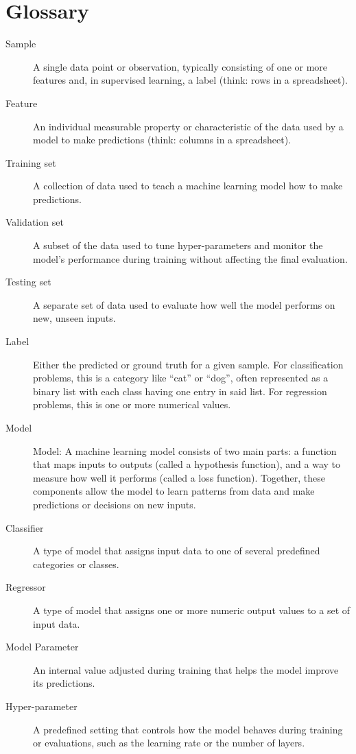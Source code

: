 \chapter*{Glossary}

\begin{description}
    \item[Sample] A single data point or observation, typically consisting of one or more features and, in supervised learning, a label (think: rows in a spreadsheet).
    \item[Feature] An individual measurable property or characteristic of the data used by a model to make predictions (think: columns in a spreadsheet).
    \item[Training set] A collection of data used to teach a machine learning model how to make predictions.
    \item[Validation set] A subset of the data used to tune hyper-parameters and monitor the model's performance during training without affecting the final evaluation.
    \item[Testing set] A separate set of data used to evaluate how well the model performs on new, unseen inputs.
    \item[Label] Either the predicted or ground truth for a given sample. 
    For classification problems, this is a category like ``cat'' or ``dog'', often represented as a binary list with each class having one entry in said list. 
    For regression problems, this is one or more numerical values.
    \item[Model] Model: A machine learning model consists of two main parts: a function that maps inputs to outputs (called a hypothesis function), and a way to measure how well it performs (called a loss function). Together, these components allow the model to learn patterns from data and make predictions or decisions on new inputs.
    \item[Classifier] A type of model that assigns input data to one of several predefined categories or classes.
    \item[Regressor] A type of model that assigns one or more numeric output values to a set of input data.
    \item[Model Parameter] An internal value adjusted during training that helps the model improve its predictions.
    \item[Hyper-parameter] A predefined setting that controls how the model behaves during training or evaluations, such as the learning rate or the number of layers.

\end{description}
